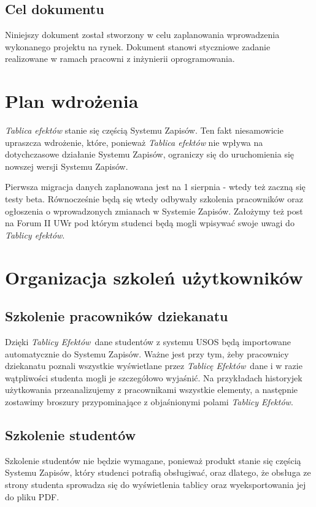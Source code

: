 \documentclass{article}
\newcommand{\TyE}{\textit{Tablicy Efektów}}
\newcommand{\TeE}{\textit{Tablicę Efektów}}
\begin{document}
\subsection{Cel dokumentu}
Niniejszy dokument został stworzony w celu zaplanowania wprowadzenia wykonanego projektu na rynek.
Dokument stanowi styczniowe zadanie realizowane w ramach pracowni z inżynierii oprogramowania.


\section{Plan wdrożenia}
\textit{Tablica efektów} stanie się częścią Systemu Zapisów.
Ten fakt niesamowicie upraszcza wdrożenie, które, ponieważ \textit{Tablica efektów} nie wpływa na dotychczasowe działanie Systemu Zapisów, ograniczy się do uruchomienia się nowszej wersji Systemu Zapisów.

Pierwsza migracja danych zaplanowana jest na 1 sierpnia - wtedy też zaczną się testy beta. Równocześnie będą się wtedy odbywały szkolenia pracowników oraz ogłoszenia o wprowadzonych
zmianach w Systemie Zapisów. Założymy też post na Forum II UWr pod którym studenci będą mogli wpisywać swoje uwagi do \textit{Tablicy efektów}.

\section{Organizacja szkoleń użytkowników}

\subsection{Szkolenie pracowników dziekanatu}
Dzięki \TyE\ dane studentów z systemu USOS będą importowane automatycznie do Systemu Zapisów. Ważne jest przy tym, żeby pracownicy dziekanatu poznali wszystkie 
wyświetlane przez \TeE\ dane i w razie wątpliwości studenta mogli je szczegółowo wyjaśnić. Na przykładach historyjek użytkowania przeanalizujemy z pracownikami wszystkie
elementy, a następnie zostawimy broszury przypominające z objaśnionymi polami \TyE.

\subsection{Szkolenie studentów}
Szkolenie studentów nie będzie wymagane, ponieważ produkt stanie się częścią Systemu Zapisów, który studenci potrafią obsługiwać, oraz dlatego, że obsługa ze strony studenta sprowadza się do wyświetlenia tablicy oraz wyeksportowania jej do pliku PDF.
\end{document}
